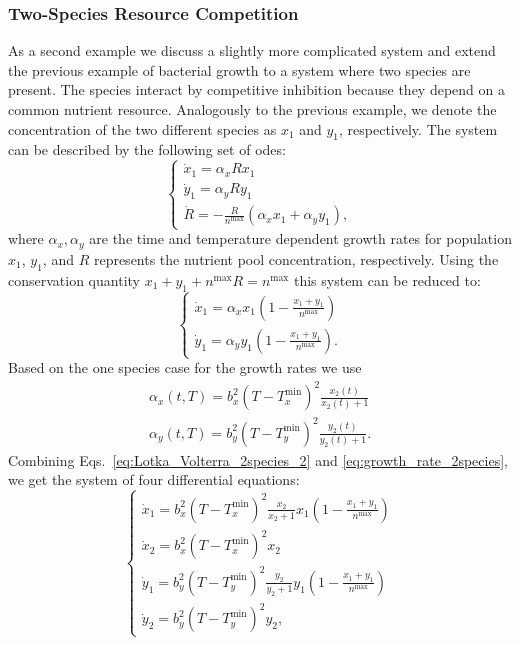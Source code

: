 \documentclass[graybox]{svmult}
\begin{document}
\subsubsection{Two-Species Resource Competition}
As a second example we discuss a slightly more complicated system and extend the previous example of bacterial growth to a system where two species are present.
The species interact by competitive inhibition because they depend on a common nutrient resource.
Analogously to the previous example, we denote the concentration of the two different species as $x_1$ and $y_1$, respectively.
The system can be described by the following set of \acp{ode}:
\begin{equation}
    \begin{cases}
        \dot x_1 = \alpha_x R x_1 \\
        \dot y_1 = \alpha_y R y_1 \\
        \dot R = -\frac{R}{n^\text{max}}(\alpha_x x_1+\alpha_y y_1),
        \label{eq:Lotka_Volterra_2species_1}
    \end{cases}
\end{equation}
where $\alpha_x, \alpha_y$ are the time and temperature dependent growth rates for population $x_1$, $y_1$, and $R$ represents the nutrient pool concentration, respectively.
Using the conservation quantity $x_1 + y_1 + n^\text{max}R = n^\text{max}$ this system can be reduced to:
\begin{equation}
    \begin{cases}
        \dot x_1 = \alpha_x x_1\left(1-\frac{x_1+y_1}{n^\text{max}}\right) \\
        \dot y_1 = \alpha_y y_1\left(1-\frac{x_1+y_1}{n^\text{max}}\right).
    \end{cases}
    \label{eq:Lotka_Volterra_2species_2}
\end{equation}
Based on the one species case for the growth rates we use~\cite{baranyiDynamicApproach1994,ratkowsky_relationship_1982}
\begin{eqnarray}
    \alpha_x (t, T) = b_x^2 (T - T^\text{min}_x)^2 \frac{x_2(t)}{x_2(t) + 1}\\
    \alpha_y (t, T) = b_y^2 (T - T^\text{min}_y)^2 \frac{y_2(t)}{y_2(t) + 1}.
    \label{eq:growth_rate_2species}
\end{eqnarray}
Combining Eqs.~\ref{eq:Lotka_Volterra_2species_2} and \ref{eq:growth_rate_2species}, we get the system of four differential equations:
\begin{equation}
    \begin{cases}
        \dot x_1 = b_x^2 (T - T^\text{min}_x)^2 \frac{x_2}{x_2 + 1} x_1 (1 - \frac{x_1 + y_1}{n^\text{max}})\\
        \dot x_2 = b_x^2 (T - T^\text{min}_x)^2 x_2 \\
        \dot y_1 = b_y^2 (T - T^\text{min}_y)^2 \frac{y_2}{y_2 + 1} y_1 (1 - \frac{x_1 + y_1}{n^\text{max}})\\
        \dot y_2 = b_y^2 (T - T^\text{min}_y)^2 y_2,
        \label{eq:model_2species_resource}
    \end{cases}  
\end{equation}
\end{document}
